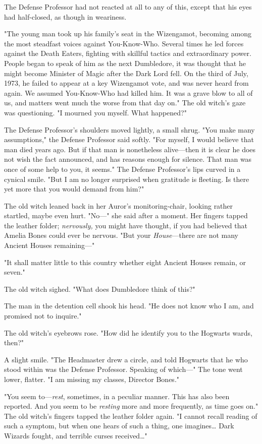 The Defense Professor had not reacted at all to any of this, except that his
eyes had half-closed, as though in weariness.

"The young man took up his family's seat in the Wizengamot, becoming among the
most steadfast voices against You-Know-Who. Several times he led forces against
the Death Eaters, fighting with skillful tactics and extraordinary power.
People began to speak of him as the next Dumbledore, it was thought that he
might become Minister of Magic after the Dark Lord fell. On the third of July,
1973, he failed to appear at a key Wizengamot vote, and was never heard from
again. We assumed You-Know-Who had killed him. It was a grave blow to all of
us, and matters went much the worse from that day on." The old witch's gaze was
questioning. "I mourned you myself. What happened?"

The Defense Professor's shoulders moved lightly, a small shrug. "You make many
assumptions," the Defense Professor said softly. "For myself, I would believe
that man died years ago. But if that man is nonetheless alive---then it is
clear he does not wish the fact announced, and has reasons enough for silence.
That man was once of some help to you, it seems." The Defense Professor's lips
curved in a cynical smile. "But I am no longer surprised when gratitude is
fleeting. Is there yet more that you would demand from him?"

The old witch leaned back in her Auror's monitoring-chair, looking rather
startled, maybe even hurt. "No---" she said after a moment. Her fingers tapped
the leather folder; \emph{nervously,} you might have thought, if you had
believed that Amelia Bones could ever be nervous. "But your
\emph{House}---there are not many Ancient Houses remaining---"

"It shall matter little to this country whether eight Ancient Houses remain, or
seven."

The old witch sighed. "What does Dumbledore think of this?"

The man in the detention cell shook his head. "He does not know who I am, and
promised not to inquire."

The old witch's eyebrows rose. "How did he identify you to the Hogwarts wards,
then?"

A slight smile. "The Headmaster drew a circle, and told Hogwarts that he who
stood within was the Defense Professor. Speaking of which---" The tone went
lower, flatter. "I am missing my classes, Director Bones."

"You seem to---\emph{rest}, sometimes, in a peculiar manner. This has also been
reported. And you seem to be \emph{resting} more and more frequently, as time
goes on." The old witch's fingers tapped the leather folder again. "I cannot
recall reading of such a symptom, but when one hears of such a thing, one
imagines{\ldots} Dark Wizards fought, and terrible curses received{\ldots}"

